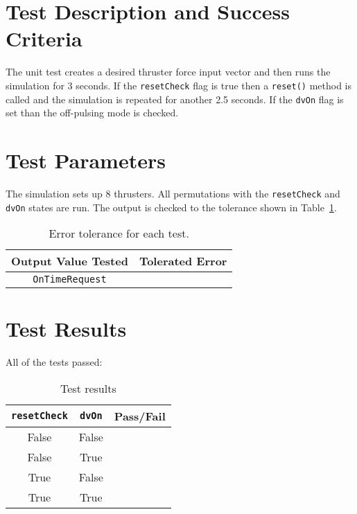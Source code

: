 
\section{Test Description and Success Criteria}
The unit test creates a desired thruster force input vector and then runs the simulation for 3 seconds.  If the {\tt resetCheck} flag is true then a {\tt reset()} method is called and the simulation is repeated for another 2.5 seconds.  If the {\tt dvOn} flag is set than the off-pulsing mode is checked.  




\section{Test Parameters}

The simulation sets up 8 thrusters.  All permutations with the {\tt resetCheck} and {\tt dvOn} states are run.  The output is checked to the tolerance shown in Table~\ref{tab:errortol}.

\begin{table}[htbp]
	\caption{Error tolerance for each test.}
	\label{tab:errortol}
	\centering \fontsize{10}{10}\selectfont
	\begin{tabular}{ c | c } %
		\hline\hline
		\textbf{Output Value Tested}  & \textbf{Tolerated Error}  \\ 
		\hline
		{\tt OnTimeRequest}        & 	   \\ 
		\hline\hline
	\end{tabular}
\end{table}




\section{Test Results}
All of the tests passed:
\begin{table}[H]
	\caption{Test results}
	\label{tab:results}
	\centering \fontsize{10}{10}\selectfont
	\begin{tabular}{c | c  | c } %
		\hline\hline
		{\tt resetCheck} & {\tt dvOn} &\textbf{Pass/Fail} \\ 
		\hline
	   False & False	   			&  \\ 
	   False & True	   			&  \\ 
	   True & False	   			&  \\ 
	   True & True	   			&  \\ 
	   \hline\hline
	\end{tabular}
\end{table}



